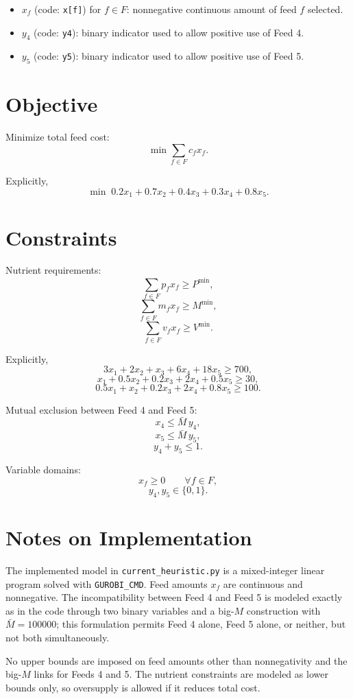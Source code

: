 \begin{itemize}
    \item \(x_f\) (code: \texttt{x[f]}) for \(f \in F\): nonnegative continuous amount of feed \(f\) selected.
    \item \(y_4\) (code: \texttt{y4}): binary indicator used to allow positive use of Feed 4.
    \item \(y_5\) (code: \texttt{y5}): binary indicator used to allow positive use of Feed 5.
\end{itemize}

\section*{Objective}

Minimize total feed cost:
\[
\min \sum_{f \in F} c_f x_f.
\]

Explicitly,
\[
\min\; 0.2x_1 + 0.7x_2 + 0.4x_3 + 0.3x_4 + 0.8x_5.
\]

\section*{Constraints}

Nutrient requirements:
\[
\sum_{f \in F} p_f x_f \ge P^{\min},
\]
\[
\sum_{f \in F} m_f x_f \ge M^{\min},
\]
\[
\sum_{f \in F} v_f x_f \ge V^{\min}.
\]

Explicitly,
\[
3x_1 + 2x_2 + x_3 + 6x_4 + 18x_5 \ge 700,
\]
\[
x_1 + 0.5x_2 + 0.2x_3 + 2x_4 + 0.5x_5 \ge 30,
\]
\[
0.5x_1 + x_2 + 0.2x_3 + 2x_4 + 0.8x_5 \ge 100.
\]

Mutual exclusion between Feed 4 and Feed 5:
\[
x_4 \le \bar M\, y_4,
\]
\[
x_5 \le \bar M\, y_5,
\]
\[
y_4 + y_5 \le 1.
\]

Variable domains:
\[
x_f \ge 0 \qquad \forall f \in F,
\]
\[
y_4,y_5 \in \{0,1\}.
\]

\section*{Notes on Implementation}

The implemented model in \texttt{current\_heuristic.py} is a mixed-integer linear program solved with \texttt{GUROBI\_CMD}. Feed amounts \(x_f\) are continuous and nonnegative. The incompatibility between Feed 4 and Feed 5 is modeled exactly as in the code through two binary variables and a big-\(M\) construction with \(\bar M=100000\); this formulation permits Feed 4 alone, Feed 5 alone, or neither, but not both simultaneously.

No upper bounds are imposed on feed amounts other than nonnegativity and the big-\(M\) links for Feeds 4 and 5. The nutrient constraints are modeled as lower bounds only, so oversupply is allowed if it reduces total cost.
